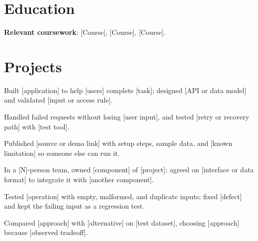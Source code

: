 \documentclass{resume}
\begin{document}

\section{Education}

\begin{jobduties}
  \item \textbf{Relevant coursework}: [Course], [Course], [Course].
\end{jobduties}

\section{Projects}

\begin{jobduties}
  \item Built [application] to help [users] complete [task]; designed [API or data model] and validated [input or access rule].
  \item Handled failed requests without losing [user input], and tested [retry or recovery path] with [test tool].
  \item Published [source or demo link] with setup steps, sample data, and [known limitation] so someone else can run it.
\end{jobduties}

\begin{jobduties}
  \item In a [N]-person team, owned [component] of [project]; agreed on [interface or data format] to integrate it with [another component].
  \item Tested [operation] with empty, malformed, and duplicate inputs; fixed [defect] and kept the failing input as a regression test.
  \item Compared [approach] with [alternative] on [test dataset], choosing [approach] because [observed tradeoff].
\end{jobduties}
\end{document}
